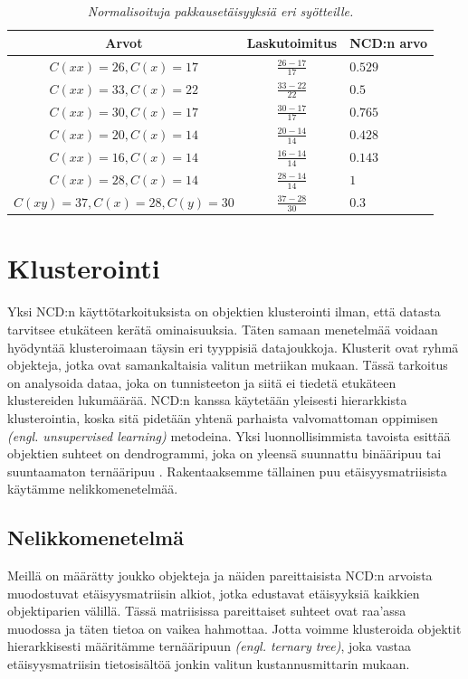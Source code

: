 \documentclass[12pt,finnish]{tktltiki2}
\theoremstyle{definition}
\theoremstyle{remark}
\newcommand{\engl}[1]{\emph{(engl. #1)}}
\begin{document}
  \begin{table}[t]
    \begin{tabular}{c|c|l}
      Arvot                    & Laskutoimitus      & NCD:n arvo        \\ \hline
      $ C(xx) = 26, C(x) = 17$ & $\frac{26-17}{17} $ & $0.529$          \\ \hline
      $ C(xx) = 33, C(x) = 22$ & $\frac{33-22}{22} $ & $0.5$            \\ \hline
      $ C(xx) = 30, C(x) = 17$ & $\frac{30-17}{17} $ & $0.765$          \\ \hline
      $ C(xx) = 20, C(x) = 14$ & $\frac{20-14}{14} $ & $0.428$          \\ \hline
      $ C(xx) = 16, C(x) = 14$ & $\frac{16-14}{14} $ & $0.143$          \\ \hline
      $ C(xx) = 28, C(x) = 14$ & $\frac{28-14}{14} $ & $1$              \\ \hline
      $ C(xy) = 37, C(x) = 28, C(y) = 30$ & $\frac{37-28}{30} $ & $0.3$ \\
    \end{tabular}
    \caption{\emph{Normalisoituja pakkausetäisyyksiä eri syötteille.}}
    \label{tab:NCD-values}
  \end{table}


\section{Klusterointi} %
\label{sec:klusterointi}

  Yksi NCD:n käyttötarkoituksista on objektien klusterointi ilman, että datasta tarvitsee etukäteen kerätä ominaisuuksia.
  Täten samaan menetelmää voidaan hyödyntää klusteroimaan täysin eri tyyppisiä datajoukkoja.
  Klusterit ovat ryhmä objekteja, jotka ovat samankaltaisia valitun metriikan mukaan.
  Tässä tarkoitus on analysoida dataa, joka on tunnisteeton ja siitä ei tiedetä etukäteen klustereiden lukumäärää.
  NCD:n kanssa käytetään yleisesti hierarkkista klusterointia, koska sitä pidetään yhtenä parhaista valvomattoman oppimisen \engl{unsupervised learning} metodeina.
  Yksi luonnollisimmista tavoista esittää objektien suhteet on dendrogrammi, joka on yleensä suunnattu binääripuu tai suuntaamaton ternääripuu \cite{10.1109/WDM.2004.1358107}.
  Rakentaaksemme tällainen puu etäisyysmatriisista käytämme nelikkomenetelmää.

  \subsection{Nelikkomenetelmä} %
  \label{sub:nelikkomenetelma}
    Meillä on määrätty joukko objekteja ja näiden pareittaisista NCD:n arvoista muodostuvat etäisyysmatriisin alkiot, jotka edustavat etäisyyksiä kaikkien objektiparien välillä.
    Tässä matriisissa pareittaiset suhteet ovat raa'assa muodossa ja täten tietoa on vaikea hahmottaa.
    Jotta voimme klusteroida objektit hierarkkisesti määritämme ternääripuun \engl{ternary tree}, joka vastaa etäisyysmatriisin tietosisältöä jonkin valitun kustannusmittarin mukaan.
\end{document}
